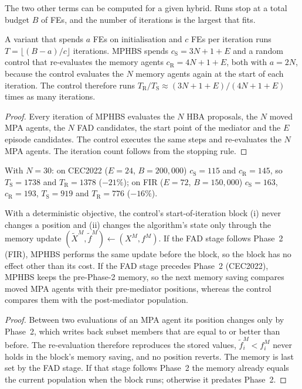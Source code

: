 The two other terms can be computed for a given hybrid. Runs stop at a total budget $B$ of FEs, and the number of iterations
is the largest that fits.

\begin{proposition}
\label{prop:iter}
A variant that spends $a$ FEs on initialisation and $c$ FEs per iteration runs $T=\lfloor (B-a)/c\rfloor$ iterations.
MPHBS spends $c_\mathrm{S}=3N+1+E$ and a random control that re-evaluates the memory agents $c_\mathrm{R}=4N+1+E$, both with $a=2N$, because the
control evaluates the $N$ memory agents again at the start of each iteration. The control therefore runs
$T_\mathrm{R}/T_\mathrm{S}\approx(3N+1+E)/(4N+1+E)$ times as many iterations.
\end{proposition}
\begin{proof}
Every iteration of MPHBS evaluates the $N$ HBA proposals, the $N$ moved MPA agents, the $N$ FAD candidates, the start point
of the mediator and the $E$ episode candidates. The control executes the same steps and re-evaluates the $N$ MPA agents. The iteration count follows from the stopping rule.
\end{proof}

With $N=30$: on CEC2022 ($E=24$, $B=200{,}000$) $c_\mathrm{S}=115$ and $c_\mathrm{R}=145$, so $T_\mathrm{S}=1738$ and
$T_\mathrm{R}=1378$ ($-21\%$); on FIR ($E=72$, $B=150{,}000$) $c_\mathrm{S}=163$, $c_\mathrm{R}=193$, $T_\mathrm{S}=919$ and
$T_\mathrm{R}=776$ ($-16\%$).

\begin{proposition}
\label{prop:memory}
With a deterministic objective, the control's start-of-iteration block (i) never changes a position and (ii) changes the
algorithm's state only through the memory update $(\tilde X^M,\tilde f^M)\gets(X^M,f^M)$. If the FAD stage follows Phase~2
(FIR), MPHBS performs the same update before the block, so the block has no effect other than its cost. If the FAD stage
precedes Phase~2 (CEC2022), MPHBS keeps the pre-Phase-2 memory, so the next memory saving compares moved MPA agents with
their pre-mediator positions, whereas the control compares them with the post-mediator population.
\end{proposition}
\begin{proof}
Between two evaluations of an MPA agent its position changes only by Phase~2, which writes back subset members that are
equal to or better than before. The re-evaluation therefore reproduces the stored values, $\tilde f^M_i<f^M_i$ never holds in
the block's memory saving, and no position reverts. The memory is last set by the FAD stage. If that stage follows Phase~2
the memory already equals the current population when the block runs; otherwise it predates Phase~2.
\end{proof}

